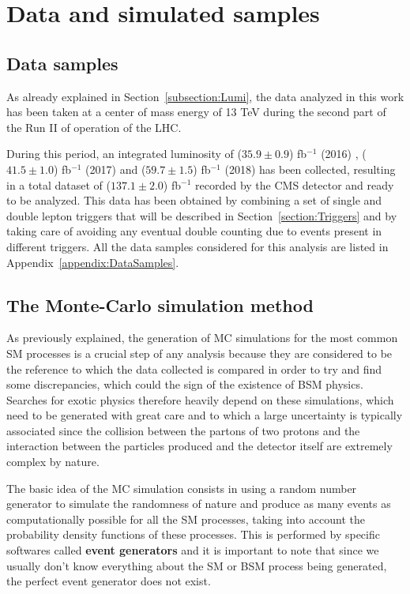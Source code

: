 \documentclass[a4paper, 10pt, openright]{report}
\begin{document}
\section{Data and simulated samples} \label{section:Samples}

\subsection{Data samples} \label{section:Data}

As already explained in Section~\ref{subsection:Lumi}, the data analyzed in this work has been taken at a center of mass energy of 13 TeV during the second part of the Run II of operation of the \ac{LHC}. 

During this period, an integrated luminosity of ($35.9 \pm 0.9$) fb$^{-1}$ (2016) \cite{Lumi2016}, ($41.5 \pm 1.0$) fb$^{-1}$ (2017) \cite{Lumi2017} and ($59.7 \pm 1.5$) fb$^{-1}$ (2018) \cite{Lumi2018} has been collected, resulting in a total dataset of ($137.1 \pm 2.0$) fb$^{-1}$ recorded by the \ac{CMS} detector and ready to be analyzed. This data has been obtained by combining a set of single and double lepton triggers that will be described in Section~\ref{section:Triggers} and by taking care of avoiding any eventual double counting due to events present in different triggers. All the data samples considered for this analysis are listed in Appendix~\ref{appendix:DataSamples}.

\subsection{The Monte-Carlo simulation method} \label{section:MC}

As previously explained, the generation of \ac{MC} simulations for the most common \ac{SM} processes is a crucial step of any analysis because they are considered to be the reference to which the data collected is compared in order to try and find some discrepancies, which could the sign of the existence of \ac{BSM} physics. Searches for exotic physics therefore heavily depend on these simulations, which need to be generated with great care and to which a large uncertainty is typically associated since the collision between the partons of two protons and the interaction between the particles produced and the detector itself are extremely complex by nature. 

The basic idea of the \ac{MC} simulation consists in using a random number generator to simulate the randomness of nature and produce as many events as computationally possible for all the \ac{SM} processes, taking into account the probability density functions of these processes. This is performed by specific softwares called \textbf{event generators} and it is important to note that since we usually don't know everything about the \ac{SM} or \ac{BSM} process being generated, the perfect event generator does not exist.
\end{document}
